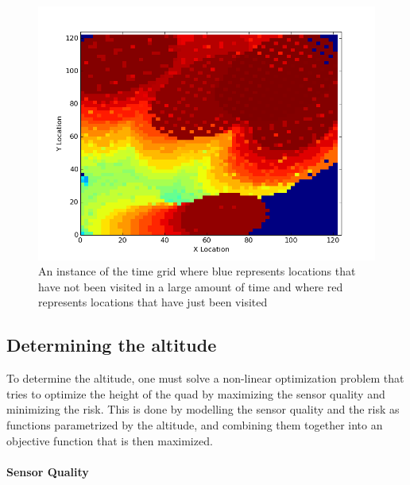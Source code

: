\documentclass[12pt]{article}
\begin{document}
\begin{figure}[ht]

    \begin{center}

        \includegraphics[width=\linewidth]{figs/timegrid_map.png}

    \end{center}

    \caption{An instance of the time grid where blue represents locations that
        have not been visited in a large amount of time and where red
    represents locations that have just been visited}
    
    \label{fig:timegrid}

\end{figure} 

\subsection{Determining the altitude}

To determine the altitude, one must solve a non-linear optimization problem
that tries to optimize the height of the quad by maximizing the sensor quality
and minimizing the risk.  This is done by modelling the sensor quality and the
risk as functions parametrized by the altitude, and combining them together
into an objective function that is then maximized.

\paragraph{Sensor Quality}
\end{document}

